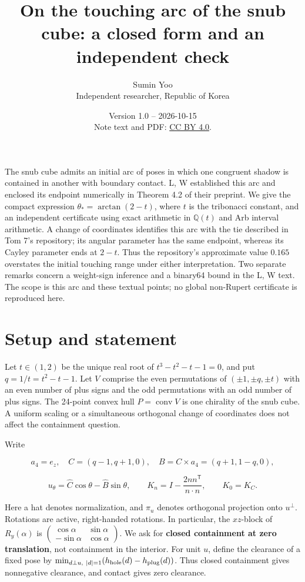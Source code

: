 \documentclass[
  10pt,
  a4paper,
]{article}
\title{On the touching arc of the snub cube: a closed form and an
independent check}
\author{Sumin Yoo\\{\normalsize Independent researcher, Republic of Korea}}
\date{Version 1.0 -- 2026-10-15\\{\small Note text and PDF: \href{https://creativecommons.org/licenses/by/4.0/}{CC BY 4.0}.}}
\begin{document}
\maketitle

The snub cube admits an initial arc of poses in which one congruent
shadow is contained in another with boundary contact. L, W established
this arc and enclosed its endpoint numerically in Theorem 4.2 of their
preprint. We give the compact expression \(\theta_*=\arctan(2-t)\),
where \(t\) is the tribonacci constant, and an independent certificate
using exact arithmetic in \(\mathbb Q(t)\) and Arb interval arithmetic.
A change of coordinates identifies this arc with the tie described in
Tom 7's repository; its angular parameter has the same endpoint, whereas
its Cayley parameter ends at \(2-t\). Thus the repository's approximate
value \(0.165\) overstates the initial touching range under either
interpretation. Two separate remarks concern a weight-sign inference and
a binary64 bound in the L, W text. The scope is this arc and these
textual points; no global non-Rupert certificate is reproduced here.

\section{Setup and statement}\label{setup-and-statement}

Let \(t\in(1,2)\) be the unique real root of \(t^3-t^2-t-1=0\), and put
\(q=1/t=t^2-t-1\). Let \(V\) comprise the even permutations of
\((\pm1,\pm q,\pm t)\) with an even number of plus signs and the odd
permutations with an odd number of plus signs. The 24-point convex hull
\(P=\operatorname{conv}V\) is one chirality of the snub cube. A uniform
scaling or a simultaneous orthogonal change of coordinates does not
affect the containment question.

Write

\[a_4=e_z,\quad C=(q-1,q+1,0),\quad B=C\times a_4=(q+1,1-q,0),\]

\[u_\theta=\widehat C\cos\theta-\widehat B\sin\theta,\qquad
K_n=I-\frac{2nn^{\mathsf T}}{n\cdot n},\qquad K_0=K_C.\]

Here a hat denotes normalization, and \(\pi_u\) denotes orthogonal
projection onto \(u^\perp\). Rotations are active, right-handed
rotations. In particular, the \(xz\)-block of \(R_y(\alpha)\) is
\(\left(\begin{smallmatrix}\cos\alpha&\sin\alpha\\-\sin\alpha&\cos\alpha\end{smallmatrix}\right)\).
We ask for \textbf{closed containment at zero translation}, not
containment in the interior. For unit \(u\), define the clearance of a
fixed pose by
\(\min_{d\perp u,\ |d|=1}(h_{\rm hole}(d)-h_{\rm plug}(d))\). Thus
closed containment gives nonnegative clearance, and contact gives zero
clearance.
\end{document}
